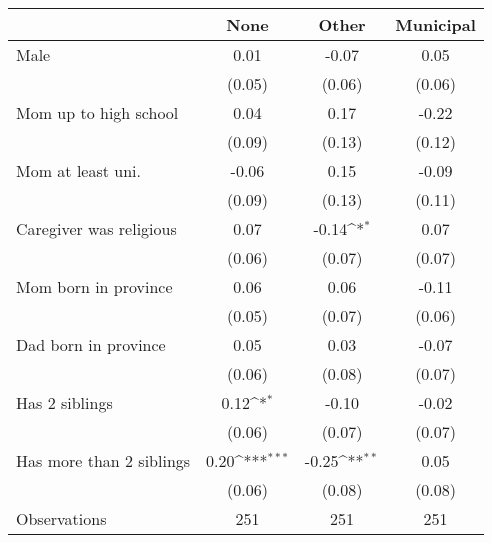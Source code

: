 {
\def\sym#1{\ifmmode^{#1}\else\(^{#1}\)\fi}
\begin{tabular}{l*{3}{c}}
\toprule
                    &\multicolumn{1}{c}{None}&\multicolumn{1}{c}{Other}&\multicolumn{1}{c}{Municipal}\\
\midrule
Male                &        0.01         &       -0.07         &        0.05         \\
                    &      (0.05)         &      (0.06)         &      (0.06)         \\
\addlinespace
Mom up to high school &        0.04         &        0.17         &       -0.22         \\
                    &      (0.09)         &      (0.13)         &      (0.12)         \\
\addlinespace
Mom at least uni.  &       -0.06         &        0.15         &       -0.09         \\
                    &      (0.09)         &      (0.13)         &      (0.11)         \\
\addlinespace
Caregiver was religious&        0.07         &       -0.14\sym{*}  &        0.07         \\
                    &      (0.06)         &      (0.07)         &      (0.07)         \\
\addlinespace
Mom born in province&        0.06         &        0.06         &       -0.11         \\
                    &      (0.05)         &      (0.07)         &      (0.06)         \\
\addlinespace
Dad born in province&        0.05         &        0.03         &       -0.07         \\
                    &      (0.06)         &      (0.08)         &      (0.07)         \\
\addlinespace
Has 2 siblings      &        0.12\sym{*}  &       -0.10         &       -0.02         \\
                    &      (0.06)         &      (0.07)         &      (0.07)         \\
\addlinespace
Has more than 2 siblings&        0.20\sym{***}&       -0.25\sym{**} &        0.05         \\
                    &      (0.06)         &      (0.08)         &      (0.08)         \\
\midrule
Observations        &         251         &         251         &         251         \\
\bottomrule
\end{tabular}
}
